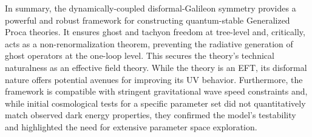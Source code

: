 \documentclass[twocolumn]{aastex631}
\begin{document}
In summary, the dynamically-coupled disformal-Galileon symmetry provides a powerful and robust framework for constructing quantum-stable Generalized Proca theories. It ensures ghost and tachyon freedom at tree-level and, critically, acts as a non-renormalization theorem, preventing the radiative generation of ghost operators at the one-loop level. This secures the theory's technical naturalness as an effective field theory. While the theory is an EFT, its disformal nature offers potential avenues for improving its UV behavior. Furthermore, the framework is compatible with stringent gravitational wave speed constraints and, while initial cosmological tests for a specific parameter set did not quantitatively match observed dark energy properties, they confirmed the model's testability and highlighted the need for extensive parameter space exploration.
\end{document}
